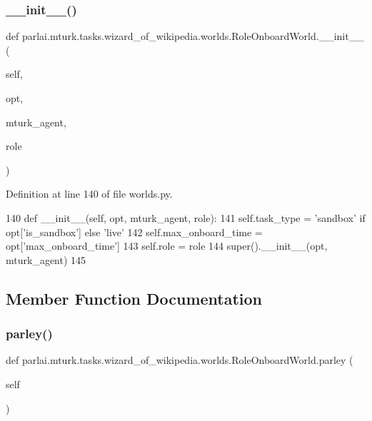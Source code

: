 \subsubsection{\texorpdfstring{\+\_\+\+\_\+init\+\_\+\+\_\+()}{\_\_init\_\_()}}
{\footnotesize\ttfamily def parlai.\+mturk.\+tasks.\+wizard\+\_\+of\+\_\+wikipedia.\+worlds.\+Role\+Onboard\+World.\+\_\+\+\_\+init\+\_\+\+\_\+ (\begin{DoxyParamCaption}\item[{}]{self,  }\item[{}]{opt,  }\item[{}]{mturk\+\_\+agent,  }\item[{}]{role }\end{DoxyParamCaption})}



Definition at line 140 of file worlds.\+py.


\begin{DoxyCode}
140     \textcolor{keyword}{def }\_\_init\_\_(self, opt, mturk\_agent, role):
141         self.task\_type = \textcolor{stringliteral}{'sandbox'} \textcolor{keywordflow}{if} opt[\textcolor{stringliteral}{'is\_sandbox'}] \textcolor{keywordflow}{else} \textcolor{stringliteral}{'live'}
142         self.max\_onboard\_time = opt[\textcolor{stringliteral}{'max\_onboard\_time'}]
143         self.role = role
144         super().\_\_init\_\_(opt, mturk\_agent)
145 
\end{DoxyCode}


\subsection{Member Function Documentation}
\mbox{\label{classparlai_1_1mturk_1_1tasks_1_1wizard__of__wikipedia_1_1worlds_1_1RoleOnboardWorld_aac8e70fe26f92df841e774fc1cb0bdb0}} 
\subsubsection{\texorpdfstring{parley()}{parley()}}
{\footnotesize\ttfamily def parlai.\+mturk.\+tasks.\+wizard\+\_\+of\+\_\+wikipedia.\+worlds.\+Role\+Onboard\+World.\+parley (\begin{DoxyParamCaption}\item[{}]{self }\end{DoxyParamCaption})}



